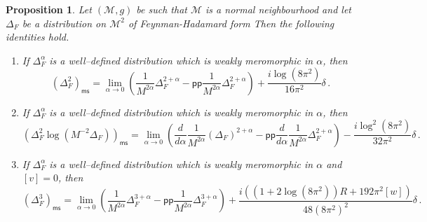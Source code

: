\documentclass[10pt]{book}
\newcommand{\pp}{\mathsf{pp}}
\newcommand{\ms}{\mathsf{ms}}
\newcommand{\Mcal}{\mathcal{M}}
\theoremstyle{break}
\newtheorem{proposition}{Proposition}
\begin{document}
\begin{proposition}
Let $(\Mcal,g)$ be such that $\Mcal$ is a normal neighbourhood and let $\Delta_F$ be a distribution on $\Mcal^2$ of Feynman-Hadamard form %
Then the following identities hold.
\begin{enumerate}
\item If $\Delta_F^{\alpha}$ is a well--defined distribution which is weakly meromorphic in $\alpha$, then
%
$$(\Delta^2_F)_\ms=\lim_{\alpha\to 0}\left(\frac{1}{M^{2\alpha}}\Delta_F^{2+\alpha}-\pp\frac{1}{M^{2\alpha}}\Delta_F^{2+\alpha}\right)+\frac{i\log(8\pi^2)}{16\pi^2}\delta\,.$$
%
\item If $\Delta_F^{\alpha}$ is a well--defined distribution which is weakly meromorphic in $\alpha$, then
%
$$(\Delta^2_F\log \left(M^{-2}\Delta_F\right))_\ms=\lim_{\alpha\to 0}\left(\frac{d}{d\alpha}\frac{1}{M^{2\alpha}}(\Delta_F)^{2+\alpha}-\pp\frac{d}{d\alpha}\frac{1}{M^{2\alpha}}\Delta_F^{2+\alpha}\right)-\frac{i\log^2(8\pi^2)}{32\pi^2}\delta\,.$$
%
\item If $\Delta_F^{\alpha}$ is a well--defined distribution which is weakly meromorphic in $\alpha$ and $[v]=0$, then 
%
$$(\Delta^3_F)_\ms=\lim_{\alpha\to 0}\left(\frac{1}{M^{2\alpha}}\Delta_F^{3+\alpha}-\pp\frac{1}{M^{2\alpha}}\Delta_F^{3+\alpha}\right)+\frac{i\left((1+2\log(8\pi^2))R+192\pi^2[w]\right)}{48(8\pi^2)^2}\delta\,.$$
%
\end{enumerate}
\end{proposition}
\end{document}
